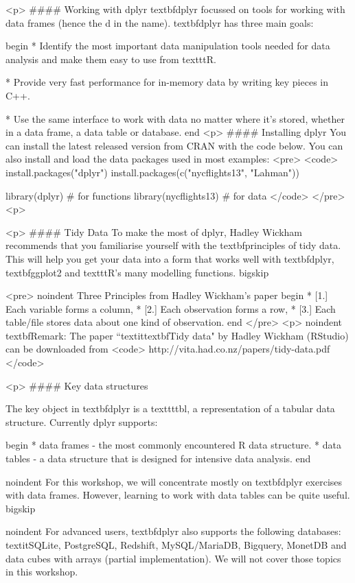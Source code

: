 <p>
#### {Working with dplyr} textbf{dplyr} focussed on tools for working with data frames (hence the d in the name). textbf{dplyr} has three main goals:


begin{ }
         * Identify the most important data manipulation tools needed for data analysis and make them easy to use from texttt{R}.

         * Provide very fast performance for in-memory data by writing key pieces in C++.

         * Use the same interface to work with data no matter where it's stored, whether in a data frame, a data table or database.
end{ }
<p>
#### {Installing dplyr}
You can install the latest released version from CRAN with the code below.
You can also install and load the data packages used in most examples: 
<pre>
<code>
install.packages("dplyr")
install.packages(c("nycflights13", "Lahman"))

library(dplyr) # for functions
library(nycflights13) # for data
</code>
</pre>
<p>

<p>
#### {Tidy Data}
To make the most of dplyr, Hadley Wickham recommends that you familiarise yourself with the textbf{principles of tidy data}. This will help you get your data into a form that works well with textbf{dplyr}, textbf{ggplot2} and texttt{R}'s many modelling functions.
bigskip

<pre>
noindent Three Principles from Hadley Wickham's paper
begin{ }
        * [1.] Each variable forms a column, 
        * [2.] Each observation forms a row, 
        * [3.] Each table/file stores data about one kind of observation.
end{ }
</pre>
<p>
noindent textbf{Remark:}  The paper ``textit{textbf{Tidy data}}" by Hadley Wickham (RStudio) can be downloaded from 
<code>
http://vita.had.co.nz/papers/tidy-data.pdf
</code>


<p>
#### {Key data structures}

The key object in textbf{dplyr} is a texttt{tbl}, a representation of a tabular data structure. Currently dplyr supports:

begin{ }
         * data frames - the  most commonly encountered R data structure. 
         * data tables - a data structure that is designed for intensive data analysis.
end{ }

noindent For this workshop, we will concentrate mostly on textbf{dplyr} exercises with data frames. However, learning to work with data tables can be quite useful.
bigskip

noindent For advanced users, textbf{dplyr} also supports the following databases: textit{SQLite, PostgreSQL, Redshift, MySQL/MariaDB, Bigquery, MonetDB} and data cubes with arrays (partial implementation). We will not cover those topics in this workshop.




